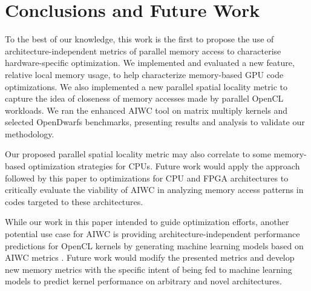 \documentclass[review=false, sigchi]{acmart}
\begin{document}
	\section{Conclusions and Future Work} \label{future work}
	
	To the best of our knowledge, this work is the first to propose the use of architecture-independent metrics of parallel memory access to characterise hardware-specific optimization. 
	We implemented and evaluated a new feature, relative local memory usage, to help characterize memory-based GPU code optimizations.
	We also implemented a new parallel spatial locality metric to capture the idea of closeness of memory accesses made by parallel OpenCL workloads.
	We ran the enhanced AIWC tool on matrix multiply kernels and selected OpenDwarfs benchmarks, presenting results and analysis to validate our methodology. 
	
	Our proposed parallel spatial locality metric may also correlate to some memory-based optimization strategies for CPUs. 
	Future work would apply the approach followed by this paper to optimizations for CPU and FPGA architectures to critically evaluate the viability of AIWC in analyzing memory access patterns in codes targeted to these architectures.
	
	While our work in this paper intended to guide optimization efforts, another potential use case for AIWC is providing architecture-independent performance predictions for OpenCL kernels by generating machine learning models based on AIWC metrics \cite{beauperformanceprediction}.  Future work would modify the presented metrics and develop new memory metrics with the specific intent of being fed to machine learning models to predict kernel performance on arbitrary and novel architectures. %
	
	
	
	
	\pagebreak
	
\end{document}
